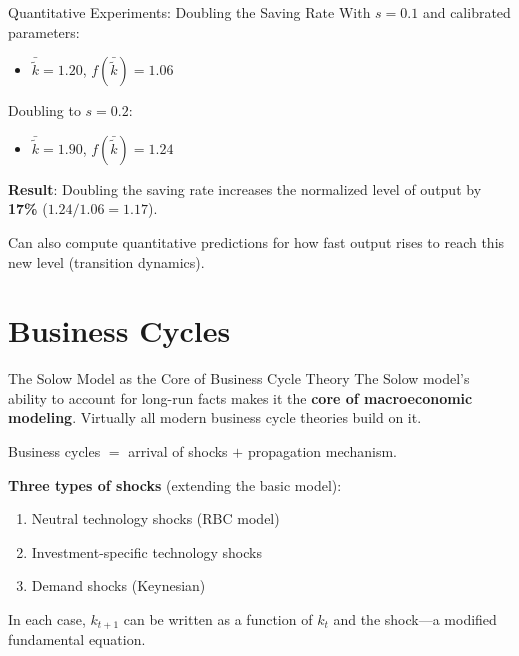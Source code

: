 \documentclass[blue]{beamer}
\begin{document}
\begin{frame}{Quantitative Experiments: Doubling the Saving Rate}
	With $s = 0.1$ and calibrated parameters:
	\begin{itemize}
		\item $\bar{\tilde{k}} = 1.20$, $f(\bar{\tilde{k}}) = 1.06$
	\end{itemize}
	
	\bigskip
	Doubling to $s = 0.2$:
	\begin{itemize}
		\item $\bar{\tilde{k}} = 1.90$, $f(\bar{\tilde{k}}) = 1.24$
	\end{itemize}
	
	\bigskip
	\textbf{Result}: Doubling the saving rate increases the normalized level of output by \textbf{17\%} ($1.24/1.06 = 1.17$).
	
	\bigskip
	Can also compute quantitative predictions for how fast output rises to reach this new level (transition dynamics).
\end{frame}

\section{Business Cycles}

\begin{frame}{The Solow Model as the Core of Business Cycle Theory}
	The Solow model's ability to account for long-run facts makes it the \textbf{core of macroeconomic modeling}. Virtually all modern business cycle theories build on it.
	
	\bigskip
	Business cycles $=$ arrival of shocks $+$ propagation mechanism.
	
	\bigskip
	\textbf{Three types of shocks} (extending the basic model):
	\begin{enumerate}
		\item Neutral technology shocks (RBC model)
		\item Investment-specific technology shocks
		\item Demand shocks (Keynesian)
	\end{enumerate}
	
	\bigskip
	In each case, $k_{t+1}$ can be written as a function of $k_t$ and the shock---a modified fundamental equation.
\end{frame}
\end{document}

